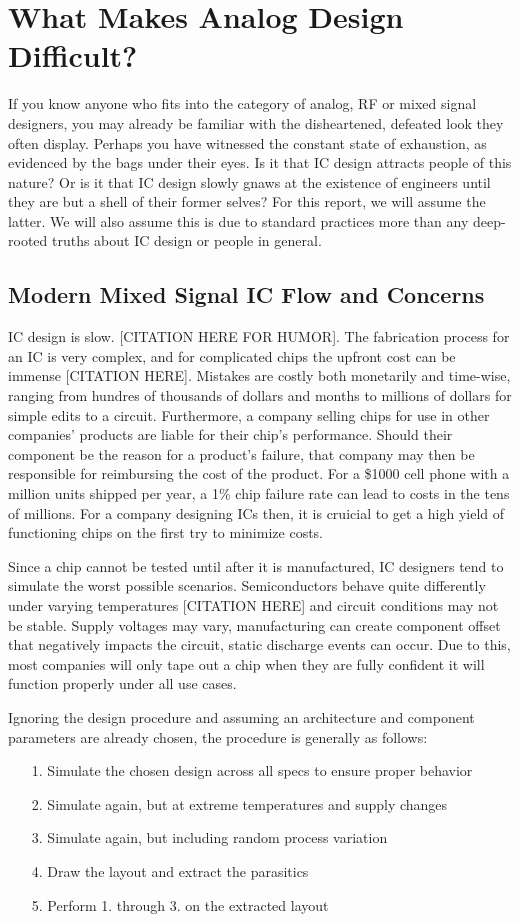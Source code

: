 \chapter{What Makes Analog Design Difficult?}

If you know anyone who fits into the category of analog, RF or mixed signal designers, you may already be familiar with the disheartened, defeated look they often display. Perhaps you have witnessed the constant state of exhaustion, as evidenced by the bags under their eyes. Is it that IC design attracts people of this nature? Or is it that IC design slowly gnaws at the existence of engineers until they are but a shell of their former selves? For this report, we will assume the latter. We will also assume this is due to standard practices more than any deep-rooted truths about IC design or people in general.

\section{Modern Mixed Signal IC Flow and Concerns}
IC design is slow. [CITATION HERE FOR HUMOR]. The fabrication process for an IC is very complex, and for complicated chips the upfront cost can be immense [CITATION HERE]. Mistakes are costly both monetarily and time-wise, ranging from hundres of thousands of dollars and months to millions of dollars for simple edits to a circuit. Furthermore, a company selling chips for use in other companies' products are liable for their chip's performance. Should their component be the reason for a product's failure, that company may then be responsible for reimbursing the cost of the product. For a \$1000 cell phone with a million units shipped per year, a 1\% chip failure rate can lead to costs in the tens of millions. For a company designing ICs then, it is cruicial to get a high yield of functioning chips on the first try to minimize costs.

Since a chip cannot be tested until after it is manufactured, IC designers tend to simulate the worst possible scenarios. Semiconductors behave quite differently under varying temperatures [CITATION HERE] and circuit conditions may not be stable. Supply voltages may vary, manufacturing can create component offset that negatively impacts the circuit, static discharge events can occur. Due to this, most companies will only tape out a chip when they are fully confident it will function properly under all use cases. 

Ignoring the design procedure and assuming an architecture and component parameters are already chosen, the procedure is generally as follows:
\begin{itemize}
\item[1.] Simulate the chosen design across all specs to ensure proper behavior
\item[2.] Simulate again, but at extreme temperatures and supply changes
\item[3.] Simulate again, but including random process variation
\item[4.] Draw the layout and extract the parasitics
\item[5.] Perform 1. through 3. on the extracted layout
\end{itemize}

